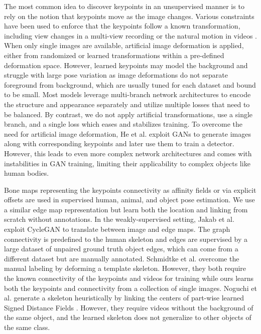 \documentclass{article}
\begin{document}
\noindent{} The most common idea to discover keypoints in an unsupervised manner is to rely on the notion that keypoints move as the image changes.
Various constraints have been used
to enforce that the keypoints follow a known transformation,
including
view changes in a multi-view recording \cite{suwajanakorn2018discovery, rhodin2018unsupervised, Rhodin_2019_CVPR} or the natural motion in videos \cite{dundar2020unsupervised, siarohin2019animating, kulkarni2019unsupervised, minderer2019unsupervised, dong2018supervision, kim2019unsupervised, jakab2020self}.
When only single images are available, artificial image deformation is applied, either from randomized
\cite{thewlis2017unsupervised, zhang2018unsupervised, jakab2018unsupervised, lorenz2019unsupervised} or learned \cite{wu2019transgaga, xu2020unsupervised} transformations within a pre-defined deformation space. 
However, 
learned keypoints may model the background \cite{zhang2018unsupervised, siarohin2019animating} and struggle with large pose variation \cite{hung2019scops} as image deformations do not separate foreground from background, which are usually tuned for each dataset
and bound to be small.
Most models leverage multi-branch network architectures to encode the structure and appearance separately and utilize multiple losses that need to be balanced. By contrast, we do not apply artificial transformations, use a single branch, and a single loss which eases and stabilizes training.
To overcome the need for artificial image deformation, He et al. \cite{he2021latentkeypointgan, he2022ganseg} exploit GANs to generate images along with corresponding keypoints and later use them to train a detector. However, this leads to even more complex network architectures and comes with instabilities in GAN training, limiting their applicability to complex objects like human bodies. 

\noindent{} Bone maps representing the keypoints connectivity as affinity fields \cite{cao2017realtime} or via explicit offsets \cite{papandreou2018personlab} are used in supervised 
human, animal, and object pose estimation.
We use a similar edge map representation but learn both the location and linking from scratch without annotations.
In the weakly-supervised setting, Jakab et al. \cite{jakab2020self} exploit CycleGAN \cite{zhu2017unpaired} to translate between image and edge maps. The graph connectivity is predefined to the human skeleton and edges are supervised by a large dataset of unpaired ground truth object edges, which can come from a different dataset but are manually annotated. Schmidtke et al. \cite{schmidtke2021unsupervised} overcome the manual labeling by deforming a template skeleton. However, they both require the known connectivity of the keypoints and videos for training while ours learns both the keypoints and connectivity from a collection of single images. Noguchi et al. \cite{noguchi2021watch} generate a skeleton heuristically by linking the centers of part-wise learned Signed Distance Fields \cite{malladi1995shape}. However, they require videos without the background of the same object, and the learned skeleton does not generalize to other objects of the same class.
\end{document}
